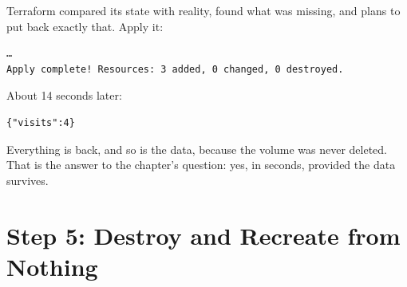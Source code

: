 
Terraform compared its state with reality, found what was missing, and plans to put back exactly that. Apply it:

\begin{codeblock}

\begin{Shaded}
\begin{Highlighting}[]
\end{Highlighting}
\end{Shaded}

\end{codeblock}

\begin{codeblock}
\begin{Verbatim}[formatcom=\outputstyle]
…
Apply complete! Resources: 3 added, 0 changed, 0 destroyed.
\end{Verbatim}
\end{codeblock}


About 14 seconds later:

\begin{codeblock}

\begin{Shaded}
\begin{Highlighting}[]
\end{Highlighting}
\end{Shaded}

\end{codeblock}

\begin{codeblock}
\begin{Verbatim}[formatcom=\outputstyle]
{"visits":4}
\end{Verbatim}
\end{codeblock}

Everything is back, and so is the data, because the volume was never deleted. That is the answer to the chapter's question: yes, in seconds, provided the data survives.


\section{Step 5: Destroy and Recreate from Nothing}\label{11-lab-rebuild-everything-from-code:step-5-destroy-and-recreate-from-nothing}

